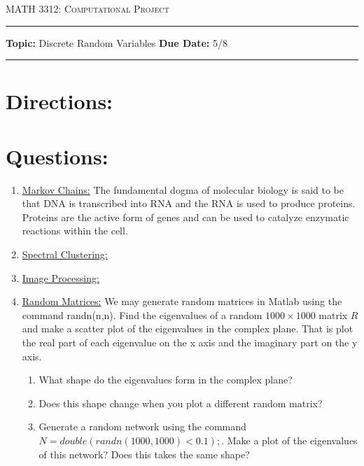 \documentclass[11pt, a4paper]{article}
\begin{document}
\begin{center}
{\Large \textsc{MATH 3312:  Computational Project}}
\end{center}

\begin{center}
\rule{6.5in}{0.4pt}
\begin{minipage}[t]{0.90 \textwidth}
\textbf{Topic:}  Discrete Random Variables \hspace{2.0in} \textbf{Due Date:}  5/8\\
\end{minipage}
\rule{6.5in}{0.4pt}
\end{center}
\vspace{.5cm}
\setlength{\unitlength}{1in}
\renewcommand{\arraystretch}{2}

\section*{Directions:}


\section*{Questions:}
\begin{enumerate}
\item \underline{Markov Chains:} The fundamental dogma of molecular biology is said to be that DNA is transcribed into RNA and the RNA is used to produce proteins. Proteins are the active form of genes and can be used to catalyze enzymatic reactions within the cell. 

\item \underline{Spectral Clustering:}


\item \underline{Image Processing: }

\item \underline{Random Matrices:} We may generate random matrices in Matlab using the command randn(n,n). Find the eigenvalues of a random $1000 \times 1000$ matrix $R$ and make a scatter plot of the eigenvalues in the complex plane. That is plot the real part of each eigenvalue on the x axis and the imaginary part on the y axis. 
\begin{enumerate}
\item What shape do the eigenvalues form in the complex plane? 
\item Does this shape change when you plot a different random matrix?
\item Generate a random network using the command $N=double(randn(1000,1000)<0.1);$. Make a plot of the eigenvalues of this network? Does this takes the same shape?

\end{enumerate}



\end{enumerate}


\end{document}
